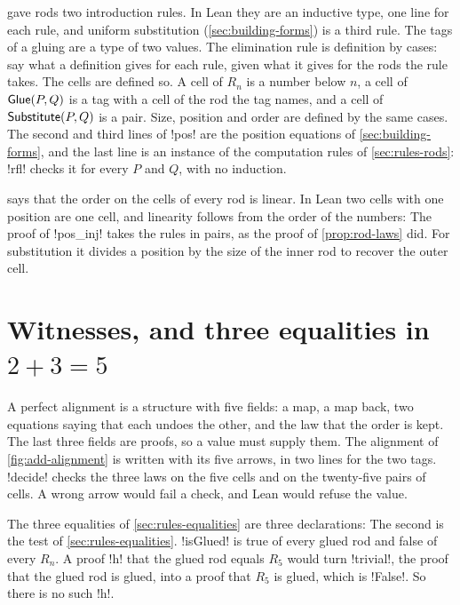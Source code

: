  gave rods two introduction rules. In Lean they are an
inductive type, one line for each rule, and uniform substitution
(\cref{sec:building-forms}) is a third rule. The tags of a gluing are a type
of two values.
The elimination rule is definition by cases: say what a definition gives for
each rule, given what it gives for the rods the rule takes. The cells are
defined so. A cell of $R_n$ is a number below $n$, a cell of ${\mathsf{Glue}}(P,Q)$ is a
tag with a cell of the rod the tag names, and a cell of ${\mathsf{Substitute}}(P,Q)$ is a
pair.
Size, position and order are defined by the same cases. The second and third
lines of \li!pos! are the position equations of \cref{sec:building-forms},
and the last line is an instance of the computation rules of
\cref{sec:rules-rods}: \li!rfl! checks it for every $P$ and $Q$, with no
induction.

 says that the order on the cells of every rod is
linear. In Lean two cells with one position are one cell, and linearity
follows from the order of the numbers:
The proof of \li!pos_inj! takes the rules in pairs, as the proof of
\cref{prop:rod-laws} did. For substitution it divides a position by the size
of the inner rod to recover the outer cell.

\section*{Witnesses, and three equalities in \texorpdfstring{$2+3=5$}{2+3=5}}
\label{sec:lean-witnesses}

A perfect alignment is a structure with five fields: a map, a map back, two
equations saying that each undoes the other, and the law that the order is
kept. The last three fields are proofs, so a value must supply them.
The alignment of \cref{fig:add-alignment} is written with its five arrows,
in two lines for the two tags. \li!decide! checks the three laws on the five
cells and on the twenty-five pairs of cells. A wrong arrow would fail a
check, and Lean would refuse the value.

The three equalities of \cref{sec:rules-equalities} are three declarations:
The second is the test of \cref{sec:rules-equalities}. \li!isGlued! is true
of every glued rod and false of every $R_n$. A proof \li!h! that the glued
rod equals $R_5$ would turn \li!trivial!, the proof that the glued rod is
glued, into a proof that $R_5$ is glued, which is \li!False!. So there is no
such \li!h!.

